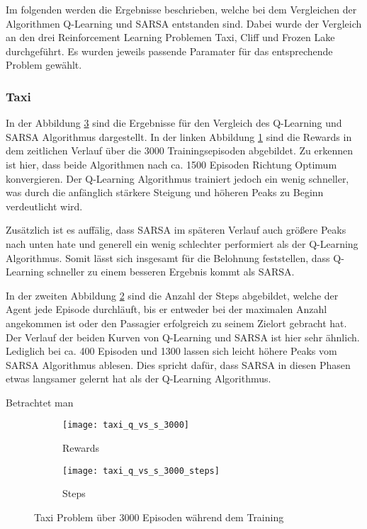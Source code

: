 Im folgenden werden die Ergebnisse beschrieben, welche bei dem Vergleichen der Algorithmen Q-Learning und SARSA entstanden sind.
Dabei wurde der Vergleich an den drei Reinforcement Learning Problemen Taxi, Cliff und Frozen Lake durchgeführt. Es wurden jeweils passende Paramater für das entsprechende Problem gewählt.
\subsubsection{Taxi}

In der Abbildung \ref{fig:taxi_train} sind die Ergebnisse für den Vergleich des Q-Learning und SARSA Algorithmus dargestellt. In der linken Abbildung \ref{fig:taxi_rew} sind die Rewards in dem zeitlichen Verlauf über die 3000 Trainingsepisoden abgebildet. Zu erkennen ist hier, dass beide Algorithmen nach ca. 1500 Episoden Richtung Optimum konvergieren. Der Q-Learning Algorithmus trainiert jedoch ein wenig schneller, was durch die anfänglich stärkere Steigung und höheren Peaks zu Beginn verdeutlicht wird.

Zusätzlich ist es auffälig, dass SARSA im späteren Verlauf auch größere Peaks nach unten hate und generell ein wenig schlechter performiert als der Q-Learning Algorithmus. Somit lässt sich insgesamt für die Belohnung feststellen, dass Q-Learning schneller zu einem besseren Ergebnis kommt als SARSA. 

In der zweiten Abbildung \ref{fig:taxi_step} sind die Anzahl der Steps abgebildet, welche der Agent jede Episode durchläuft, bis er entweder bei der maximalen Anzahl angekommen ist oder den Passagier erfolgreich zu seinem Zielort gebracht hat. Der Verlauf der beiden Kurven von Q-Learning und SARSA ist hier sehr ähnlich. Lediglich bei ca. 400 Episoden und 1300 lassen sich leicht höhere Peaks vom SARSA Algorithmus ablesen.
Dies spricht dafür, dass SARSA in diesen Phasen etwas langsamer gelernt hat als der Q-Learning Algorithmus.

Betrachtet man 

\begin{figure}[H]
    \centering
    \begin{subfigure}{.5\textwidth}
      \centering
      \texttt{[image: taxi\_q\_vs\_s\_3000]}
      \caption{Rewards}
      \label{fig:taxi_rew}
    \end{subfigure}%
    \begin{subfigure}{.5\textwidth}
      \centering
      \texttt{[image: taxi\_q\_vs\_s\_3000\_steps]}
      \caption{Steps}
      \label{fig:taxi_step}
    \end{subfigure}
    \caption{Taxi Problem über 3000 Episoden während dem Training}
    \label{fig:taxi_train}
\end{figure}

